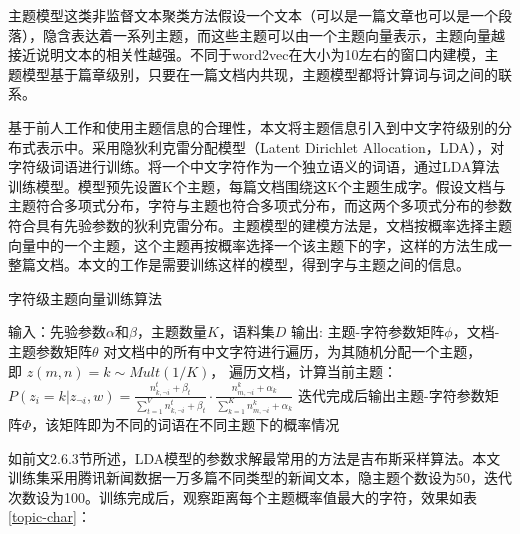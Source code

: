 \documentclass[winfonts,master,oneside,nobackinfo]{njuthesis}
\begin{document}
主题模型这类非监督文本聚类方法假设一个文本（可以是一篇文章也可以是一个段落），隐含表达着一系列主题，而这些主题可以由一个主题向量表示，主题向量越接近说明文本的相关性越强。不同于word2vec在大小为10左右的窗口内建模，主题模型基于篇章级别，只要在一篇文档内共现，主题模型都将计算词与词之间的联系。

基于前人工作和使用主题信息的合理性，本文将主题信息引入到中文字符级别的分布式表示中。采用隐狄利克雷分配模型（Latent Dirichlet Allocation，LDA），对字符级词语进行训练。将一个中文字符作为一个独立语义的词语，通过LDA算法训练模型。模型预先设置K个主题，每篇文档围绕这K个主题生成字。假设文档与主题符合多项式分布，字符与主题也符合多项式分布，而这两个多项式分布的参数符合具有先验参数的狄利克雷分布。主题模型的建模方法是，文档按概率选择主题向量中的一个主题，这个主题再按概率选择一个该主题下的字，这样的方法生成一整篇文档。本文的工作是需要训练这样的模型，得到字与主题之间的信息。
\begin{algorithm}[h]
    \caption{字符级主题向量训练算法}
    \label{alg1}
    \begin{algorithmic}[1]
        \STATE 输入：先验参数$\alpha$和$\beta$，主题数量$K$，语料集$D$
        \STATE 输出: 主题-字符参数矩阵$\phi$，文档-主题参数矩阵$\theta$
        \STATE 对文档中的所有中文字符进行遍历，为其随机分配一个主题，\\即 $z(m,n)=k \sim Mult(1/K )$，  
        \STATE 遍历文档，计算当前主题：\\
        $P(z_i=k|z_{\neg i}, w) = \frac {n_{k, \neg i}^t + \beta_t} { \sum_{t=1}^{V} n_{k,\neg i}^t + \beta_t} \cdot \frac {n_{m,\neg i}^k + \alpha_k} {\sum_{k=1}^{K} n_{m, \neg i}^k + \alpha_k }$
        \STATE 迭代完成后输出主题-字符参数矩阵$\Phi$，该矩阵即为不同的词语在不同主题下的概率情况
    \end{algorithmic}
\end{algorithm}

如前文2.6.3节所述，LDA模型的参数求解最常用的方法是吉布斯采样算法。本文训练集采用腾讯新闻数据一万多篇不同类型的新闻文本，隐主题个数设为50，迭代次数设为100。训练完成后，观察距离每个主题概率值最大的字符，效果如表\ref{topic-char}：
\end{document}
